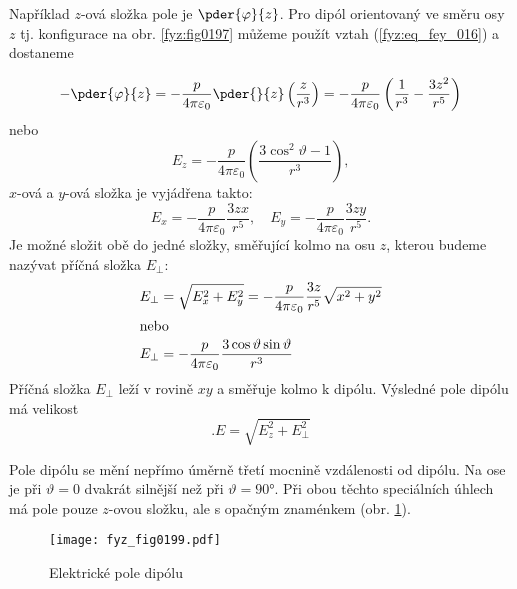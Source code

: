   Například \(z\)-ová složka pole je \(\pder{\varphi}{z}\). Pro dipól orientovaný ve směru osy \(z\)
  tj. konfigurace na obr. \ref{fyz:fig0197} můžeme použít vztah (\ref{fyz:eq_fey_016}) a dostaneme
  
  \begin{equation}\label{fyz:eq_fey_021}
  -\pder{\varphi}{z}
     = - \frac{p}{4\pi\varepsilon_0}\pder{}{z}\left(\dfrac{z}{r^3}\right)
     = - \frac{p}{4\pi\varepsilon_0}\left(\frac{1}{r^3}-\dfrac{3z^2}{r^5}\right) 
  \end{equation}
  nebo
  \begin{equation}\label{fyz:eq_fey_022}
    E_z = - \frac{p}{4\pi\varepsilon_0}\left(\dfrac{3\cos^2\vartheta-1}{r^3}\right),
  \end{equation}
  \(x\)-ová a \(y\)-ová složka je vyjádřena takto:
  \begin{equation}\label{fyz:eq_fey_023}
    E_x = - \frac{p}{4\pi\varepsilon_0}\dfrac{3zx}{r^5}, \quad
    E_y = - \frac{p}{4\pi\varepsilon_0}\dfrac{3zy}{r^5}.
  \end{equation}
  Je možné složit obě do jedné složky, směřující kolmo na osu \(z\), kterou budeme nazývat příčná
  složka \(E_\perp\):
  \begin{align}
    E_\perp &= \sqrt{E_x^2 + E_y^2} 
             = - \frac{p}{4\pi\varepsilon_0}\dfrac{3z}{r^5}\sqrt{x^2+y^2} \nonumber \\
    \shortintertext{nebo}
    E_\perp &= - \frac{p}{4\pi\varepsilon_0}\dfrac{3\cos\vartheta\sin\vartheta}{r^3} 
                                                                         \label{fyz:eq_fey_024}
  \end{align}
  Příčná složka \(E_\perp\) leží v rovině \(xy\) a směřuje kolmo k dipólu. Výsledné pole dipólu má
  velikost
  \begin{equation}\label{fyz:eq_fey_025}.
    E = \sqrt{E_z^2 + E_\perp^2} 
  \end{equation}
  
  Pole dipólu se mění nepřímo úměrně třetí mocnině vzdálenosti od dipólu. Na ose je při \(\vartheta=
  0\) dvakrát silnější než při \(\vartheta=\ang{90}\). Při obou těchto speciálních úhlech má pole
  pouze \(z\)-ovou složku, ale s opačným znaménkem (obr. \ref{fyz:fig0199}).
  \begin{figure}[ht!]
    \centering
    \texttt{[image: fyz\_fig0199.pdf]}
    \caption{Elektrické pole dipólu}
    \label{fyz:fig0199}
  \end{figure}

